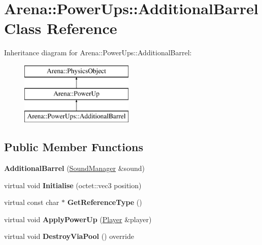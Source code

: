 \hypertarget{class_arena_1_1_power_ups_1_1_additional_barrel}{\section{Arena\+:\+:Power\+Ups\+:\+:Additional\+Barrel Class Reference}
\label{class_arena_1_1_power_ups_1_1_additional_barrel}
}
Inheritance diagram for Arena\+:\+:Power\+Ups\+:\+:Additional\+Barrel\+:\begin{figure}[H]
\begin{center}
\leavevmode
\includegraphics[height=3.000000cm]{class_arena_1_1_power_ups_1_1_additional_barrel}
\end{center}
\end{figure}
\subsection*{Public Member Functions}
\begin{DoxyCompactItemize}
\item 
\hypertarget{class_arena_1_1_power_ups_1_1_additional_barrel_a314fac6aa6be95075729d73d3deca2ad}{{\bfseries Additional\+Barrel} (\hyperlink{class_arena_1_1_sound_manager}{Sound\+Manager} \&sound)}\label{class_arena_1_1_power_ups_1_1_additional_barrel_a314fac6aa6be95075729d73d3deca2ad}

\item 
\hypertarget{class_arena_1_1_power_ups_1_1_additional_barrel_ac645977663b5ede02067f9107ec5b19d}{virtual void {\bfseries Initialise} (octet\+::vec3 position)}\label{class_arena_1_1_power_ups_1_1_additional_barrel_ac645977663b5ede02067f9107ec5b19d}

\item 
\hypertarget{class_arena_1_1_power_ups_1_1_additional_barrel_aac9fb5dfee01e692c8ad28b84c9aaf68}{virtual const char $\ast$ {\bfseries Get\+Reference\+Type} ()}\label{class_arena_1_1_power_ups_1_1_additional_barrel_aac9fb5dfee01e692c8ad28b84c9aaf68}

\item 
\hypertarget{class_arena_1_1_power_ups_1_1_additional_barrel_af98ad7a3d1173c3d6ed4d5ea4aa7e9e0}{virtual void {\bfseries Apply\+Power\+Up} (\hyperlink{class_arena_1_1_player}{Player} \&player)}\label{class_arena_1_1_power_ups_1_1_additional_barrel_af98ad7a3d1173c3d6ed4d5ea4aa7e9e0}

\item 
\hypertarget{class_arena_1_1_power_ups_1_1_additional_barrel_afa9ac2ec55662dc7a3818691a86835bb}{virtual void {\bfseries Destroy\+Via\+Pool} () override}\label{class_arena_1_1_power_ups_1_1_additional_barrel_afa9ac2ec55662dc7a3818691a86835bb}

\end{DoxyCompactItemize}
